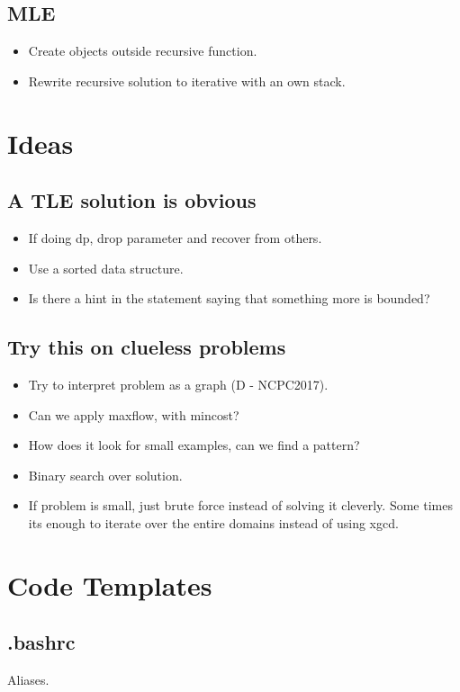 \documentclass[8pt,a4paper,landscape,oneside]{amsart}
\newcommand{\codeb}[1]{\inputminted[fontsize=\large,tabsize=2,baselinestretch=1]{bash}{src/#1}}
\begin{document}
\begin{multicols*}{2}
\begin{large}
    \subsection{MLE}
        \begin{itemize}
        \item Create objects outside recursive function.
        \item Rewrite recursive solution to iterative with an own stack.
        \end{itemize}
\section{Ideas}
    \subsection{A TLE solution is obvious}
        \begin{itemize}
        \item If doing dp, drop parameter and recover from others.
        \item Use a sorted data structure.
        \item Is there a hint in the statement saying that something more is bounded?
        \end{itemize}
    \subsection{Try this on clueless problems}
        \begin{itemize}
        \item Try to interpret problem as a graph (D - NCPC2017).
        \item Can we apply maxflow, with mincost?
        \item How does it look for small examples, can we find a pattern?
        \item Binary search over solution.
        \item If problem is small, just brute force instead of solving it cleverly.
            Some times its enough to iterate over the entire domains instead of using xgcd.
        \end{itemize}
\section{Code Templates}
    \subsection{.bashrc}
        Aliases.
        \codeb{.bashrc}

\end{large}
\end{multicols*}
\end{document}
